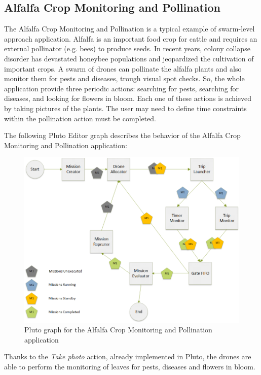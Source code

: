 \subsection{Alfalfa Crop Monitoring and Pollination}\label{alfalfa}

The Alfalfa Crop Monitoring and Pollination\cite{alfalfa} is a typical example of swarm-level approach application.
Alfalfa is an important food crop for cattle and requires an external pollinator (e.g. bees) to produce seeds. In recent years, colony collapse disorder has devastated honeybee populations and jeopardized the cultivation of important crops\cite{colony}.
A swarm of drones can pollinate the alfalfa plants and also monitor them for pests and diseases, trough visual spot checks.
So, the whole application provide three periodic actions: searching for pests, searching for diseases, and looking for flowers in bloom.
Each one of these actions is achieved by taking pictures of the plants.
The user may need to define time constraints within the pollination action must be completed.

The following Pluto Editor graph describes the behavior of the Alfalfa Crop Monitoring and Pollination\cite{alfalfa} application:

\begin{figure}[H]
  \centering
  \includegraphics[width=\linewidth]{pictures/Alfalfa_Diagram.png}
  \caption{Pluto graph for the Alfalfa Crop Monitoring and Pollination application}
  \label{fig:alfalfaGraph}
\end{figure}

Thanks to the \textit{Take photo} action, already implemented in Pluto, the drones are able to perform the monitoring of leaves for pests, diseases and flowers in bloom.
\\

